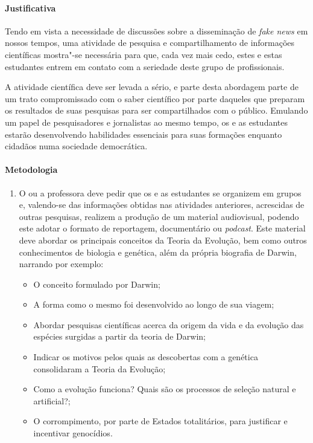 \documentclass[12pt]{extarticle}
\begin{document}
\paragraph{Justificativa} Tendo em vista a necessidade de discussões sobre
a disseminação de \textit{fake news} em nossos tempos, uma atividade de pesquisa
e compartilhamento de informações científicas mostra"-se necessária para que,
cada vez mais cedo, estes e estas estudantes entrem em contato com a seriedade
deste grupo de profissionais. 

A atividade científica deve ser levada a sério,
e parte desta abordagem parte de um trato compromissado com o saber científico
por parte daqueles que preparam os resultados de suas pesquisas para
ser compartilhados com o público. Emulando um papel de pesquisadores
e jornalistas ao mesmo tempo, os e as estudantes estarão desenvolvendo
habilidades essenciais para suas formações enquanto cidadãos numa sociedade
democrática. 

\paragraph{Metodologia} 

\begin{enumerate}

	\item
	O ou a professora deve pedir que os e as estudantes se organizem em grupos e,
	valendo-se das informações obtidas nas atividades anteriores,
	acrescidas de outras pesquisas, realizem a produção de um material audiovisual,
	podendo este adotar o formato de reportagem, documentário ou \textit{podcast}. Este
	material deve abordar os principais conceitos da Teoria da Evolução, bem como
	outros conhecimentos de biologia e genética, além da própria biografia de
	Darwin, narrando por exemplo:

\begin{itemize} \item O conceito formulado por Darwin; \item A forma como
    o mesmo foi desenvolvido ao longo de sua viagem; \item Abordar pesquisas
    científicas acerca da origem da vida e da evolução das espécies surgidas
    a partir da teoria de Darwin; \item Indicar os motivos pelos quais as
 	descobertas com a genética consolidaram a Teoria da Evolução; \item Como
	a evolução funciona? Quais são os processos de seleção natural e artificial?; 
	\item O corrompimento, por parte de Estados totalitários, para justificar
	e incentivar genocídios.
\end{itemize}

\end{enumerate}
\end{document}
